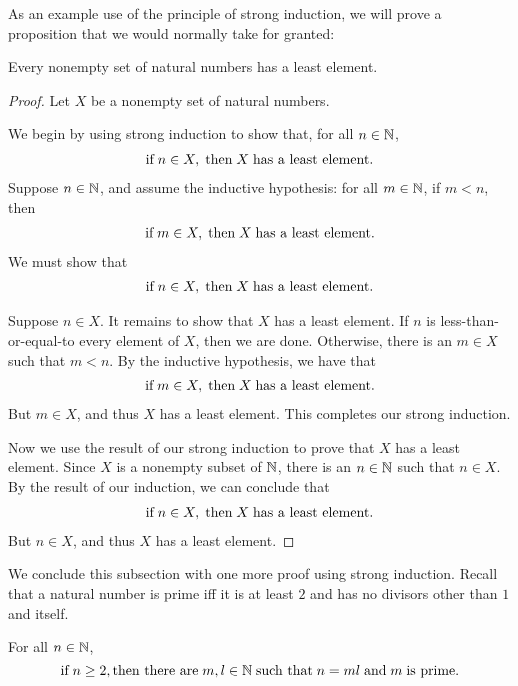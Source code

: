 As an example use of the principle of strong induction, we
will prove a proposition that we would normally take for granted:

\begin{proposition}
\label{NonemptyLeastProp}
Every nonempty set of natural numbers has a least element.
\end{proposition}

\begin{proof}
Let $X$ be a nonempty set of natural numbers.

We begin by using strong induction to show that, for all $n\in\mathbb{N}$,
\begin{gather*}
\allowbreak\mbox{if}\allowbreak\;n\in X,\;\allowbreak\mbox{then}\allowbreak\;X\;\allowbreak\mbox{has a least element}\allowbreak.
\end{gather*}
Suppose $n\in\mathbb{N}$, and assume the inductive hypothesis:
for all $m\in\mathbb{N}$, if $m<n$, then
\begin{gather*}
\allowbreak\mbox{if}\allowbreak\;m\in X,\;\allowbreak\mbox{then}\allowbreak\;X\;\allowbreak\mbox{has a least element}\allowbreak.
\end{gather*}
We must show that
\begin{gather*}
\allowbreak\mbox{if}\allowbreak\;n\in X,\;\allowbreak\mbox{then}\allowbreak\;X\;\allowbreak\mbox{has a least element}\allowbreak.
\end{gather*}

Suppose $n\in X$.  It remains to show that $X$ has a least element.
If $n$ is less-than-or-equal-to every element of $X$, then we are
done.  Otherwise, there is an $m\in X$ such that $m<n$.
By the inductive hypothesis, we have that
\begin{gather*}
\allowbreak\mbox{if}\allowbreak\;m\in X,\;\allowbreak\mbox{then}\allowbreak\;X\;\allowbreak\mbox{has a least element}\allowbreak.
\end{gather*}
But $m\in X$, and thus $X$ has a least element.  This completes our
strong induction.

Now we use the result of our strong induction to prove that $X$ has a
least element.  Since $X$ is a nonempty subset of $\mathbb{N}$, there is an
$n\in\mathbb{N}$ such that $n\in X$.  By the result of our induction, we
can conclude that
\begin{gather*}
\allowbreak\mbox{if}\allowbreak\;n\in X,\;\allowbreak\mbox{then}\allowbreak\;X\;\allowbreak\mbox{has a least element}\allowbreak.
\end{gather*}
But $n\in X$, and thus $X$ has a least element.
\end{proof}
  
We conclude this subsection with one more proof using strong
induction.  Recall that a natural number is prime iff it
is at least $2$ and has no divisors other than $1$ and itself.

\begin{proposition}
For all $n\in\mathbb{N}$,
\begin{displaymath}
\allowbreak\mbox{if}\allowbreak\;n\geq 2,
\allowbreak\mbox{then there are}\allowbreak\;m,l\in\mathbb{N}\;\allowbreak\mbox{such that}\allowbreak\;n=ml\;\allowbreak\mbox{and}\allowbreak\;m
\;\allowbreak\mbox{is prime.}\allowbreak
\end{displaymath}
\end{proposition}

